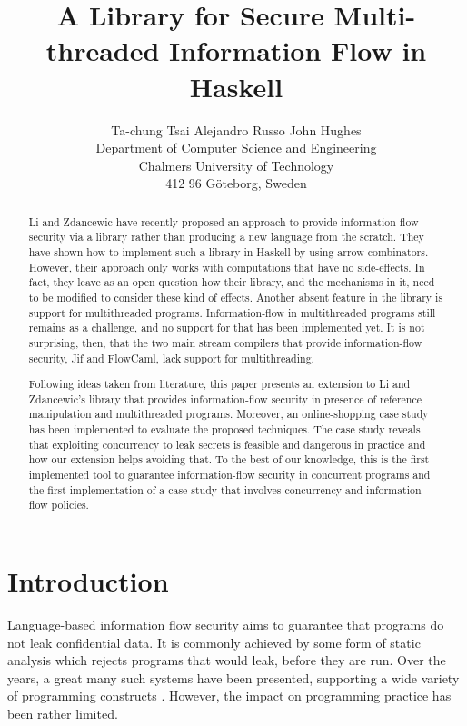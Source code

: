 \documentclass[times, 10pt,twocolumn]{article}
\begin{document}
\title{A Library for Secure Multi-threaded Information Flow in Haskell}
\author{Ta-chung Tsai \qquad Alejandro Russo \qquad John Hughes \\
Department of Computer Science and Engineering\\
Chalmers University of Technology\\
412 96 G\"{o}teborg, Sweden
}


\maketitle


\begin{abstract}
Li and Zdancewic have recently proposed an approach  
to provide information-flow security via a library rather 
than producing a new language from the scratch. They have shown how to 
implement such a library in Haskell by using arrow combinators.
However, their approach only 
works with computations that have no side-effects. In fact, they 
leave as an open question how their library, and the mechanisms 
in it, need to be modified to consider these kind of effects. Another 
absent feature in the library is support for multithreaded 
programs. Information-flow in multithreaded programs still remains
as a challenge, and no support for that has been implemented 
yet. It is not surprising, then, that the two main stream 
compilers that provide information-flow security, Jif and FlowCaml, 
lack support for multithreading. 

Following ideas taken from literature, this paper presents an extension 
to Li and Zdancewic's library that provides information-flow security in
presence of reference manipulation and multithreaded programs. 
Moreover, an online-shopping case study has been implemented to evaluate the proposed
techniques. The case study reveals that exploiting concurrency to
leak secrets is feasible and dangerous in practice and how our 
extension helps avoiding that. 
To the best of our knowledge, this is the first implemented tool to guarantee 
information-flow security in concurrent programs and the first implementation
of a case study that involves concurrency and information-flow policies. 
\end{abstract}


\section{Introduction}

Language-based information flow security aims to guarantee that
programs do not leak confidential data. It is commonly achieved by some form of static
analysis which rejects programs that would leak, before they are run.
Over the years, a great many such systems have been presented,
supporting a wide variety of programming constructs
\cite{Sabelfeld:Myers:JSAC}. However, the impact on programming
practice has been rather limited.
\end{document}
